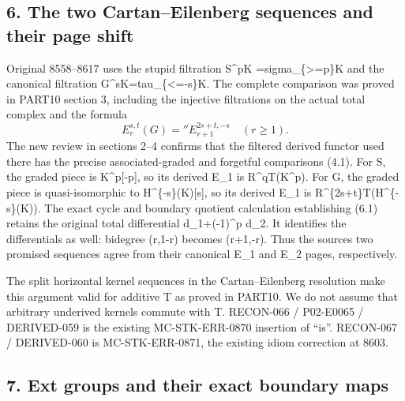 \subsection{\texorpdfstring{6. The two Cartan–\allowbreak{}Eilenberg sequences and their page shift}{6. The two  sequences and their page shift}}\label{proofs-8352-8772-the-two-cartaneilenberg-sequences-and-their-page-shift}

Original 8558–\allowbreak{}8617 uses the stupid filtration S\^{}pK \allowbreak{}=sigma\_\allowbreak{}\{>\allowbreak{}=p\}K and the canonical filtration G\textasciicircum{}sK\allowbreak{}=tau\_\allowbreak{}\{<\allowbreak{}=-s\}K. The complete comparison was proved in PART10 section 3,\allowbreak{} including the injective filtrations on the actual total complex and the formula \[
 E_r^{s,t}(G)=
 {}''E_{r+1}^{2s+t,-s}\quad(r\ge1).                          \tag{6.1}
\] The new review in sections 2–\allowbreak{}4 confirms that the filtered derived functor used there has the precise associated-graded and forgetful comparisons (4.1)\allowbreak{}. For S,\allowbreak{} the graded piece is K\textasciicircum{}p[-p]\allowbreak{},\allowbreak{} so its derived E\_\allowbreak{}1 is R\textasciicircum{}qT(K\textasciicircum{}p)\allowbreak{}. For G,\allowbreak{} the graded piece is quasi-isomorphic to H\textasciicircum{}\{-s\}(K)\allowbreak{}[s]\allowbreak{},\allowbreak{} so its derived E\_\allowbreak{}1 is R\textasciicircum{}\{2s\allowbreak{}+t\}T(H\textasciicircum{}\{-s\}(K)\allowbreak{})\allowbreak{}. The exact cycle and boundary quotient calculation establishing (6.1)\allowbreak{} retains the original total differential d\_\allowbreak{}1\allowbreak{}+(-1)\allowbreak{}\textasciicircum{}p d\_\allowbreak{}2. It identifies the differentials as well:\allowbreak{} bidegree (r,\allowbreak{}1-r)\allowbreak{} becomes (r\allowbreak{}+1,\allowbreak{}-r)\allowbreak{}. Thus the source\textquotesingle s two promised sequences agree from their canonical E\_\allowbreak{}1 and E\_\allowbreak{}2 pages,\allowbreak{} respectively.

The split horizontal kernel sequences in the Cartan–\allowbreak{}Eilenberg resolution make this argument valid for additive T as proved in PART10. We do not assume that arbitrary underived kernels commute with T. RECON-066 /\allowbreak{} P02-E0065 /\allowbreak{} DERIVED-059 is the existing MC-STK-ERR-0870 insertion of ``is''. RECON-067 /\allowbreak{} DERIVED-060 is MC-STK-ERR-0871,\allowbreak{} the existing idiom correction at 8603.

\subsection{7. Ext groups and their exact boundary maps}\label{proofs-8352-8772-ext-groups-and-their-exact-boundary-maps}

